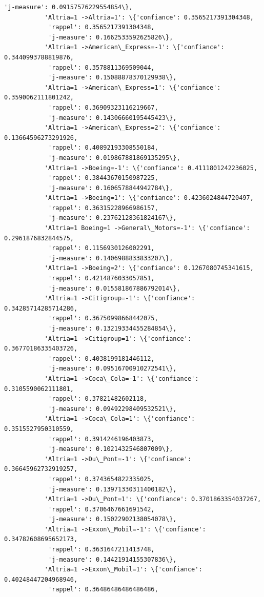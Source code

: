 \documentclass[11pt]{article}
\begin{document}
\begin{Verbatim}[commandchars=\\\{\}]
            'j-measure': 0.09157576229554854\},
           'Altria=1 ->Altria=1': \{'confiance': 0.3565217391304348,
            'rappel': 0.3565217391304348,
            'j-measure': 0.1662533592625826\},
           'Altria=1 ->American\_Express=-1': \{'confiance': 0.3440993788819876,
            'rappel': 0.3578811369509044,
            'j-measure': 0.15088878370129938\},
           'Altria=1 ->American\_Express=1': \{'confiance': 0.3590062111801242,
            'rappel': 0.36909323116219667,
            'j-measure': 0.14306660195445423\},
           'Altria=1 ->American\_Express=2': \{'confiance': 0.13664596273291926,
            'rappel': 0.40892193308550184,
            'j-measure': 0.019867881869135295\},
           'Altria=1 ->Boeing=-1': \{'confiance': 0.4111801242236025,
            'rappel': 0.38443670150987225,
            'j-measure': 0.1606578844942784\},
           'Altria=1 ->Boeing=1': \{'confiance': 0.4236024844720497,
            'rappel': 0.36315228966986157,
            'j-measure': 0.23762128361824167\},
           'Altria=1 Boeing=1 ->General\_Motors=-1': \{'confiance': 0.2961876832844575,
            'rappel': 0.1156930126002291,
            'j-measure': 0.1406988833833207\},
           'Altria=1 ->Boeing=2': \{'confiance': 0.1267080745341615,
            'rappel': 0.4214876033057851,
            'j-measure': 0.015581867886792014\},
           'Altria=1 ->Citigroup=-1': \{'confiance': 0.34285714285714286,
            'rappel': 0.36750998668442075,
            'j-measure': 0.13219334455284854\},
           'Altria=1 ->Citigroup=1': \{'confiance': 0.36770186335403726,
            'rappel': 0.4038199181446112,
            'j-measure': 0.09516700910272541\},
           'Altria=1 ->Coca\_Cola=-1': \{'confiance': 0.3105590062111801,
            'rappel': 0.37821482602118,
            'j-measure': 0.09492298409532521\},
           'Altria=1 ->Coca\_Cola=1': \{'confiance': 0.3515527950310559,
            'rappel': 0.3914246196403873,
            'j-measure': 0.1021432546807009\},
           'Altria=1 ->Du\_Pont=-1': \{'confiance': 0.36645962732919257,
            'rappel': 0.3743654822335025,
            'j-measure': 0.13971330311400182\},
           'Altria=1 ->Du\_Pont=1': \{'confiance': 0.3701863354037267,
            'rappel': 0.3706467661691542,
            'j-measure': 0.15022902138054078\},
           'Altria=1 ->Exxon\_Mobil=-1': \{'confiance': 0.34782608695652173,
            'rappel': 0.3631647211413748,
            'j-measure': 0.14421914155307836\},
           'Altria=1 ->Exxon\_Mobil=1': \{'confiance': 0.40248447204968946,
            'rappel': 0.36486486486486486,

\end{Verbatim}
\end{document}

